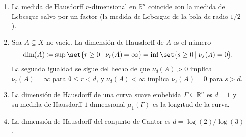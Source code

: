 \begin{nejer}
\begin{enumerate}[label = (\roman*), leftmargin=1.5em]
    \item La medida de Hausdorff $n$-dimensional en $\mathbb{R}^n$ coincide con la medida de Lebesgue salvo por un factor (la medida de Lebesgue de la bola de radio $1/2$).
    
    \item Sea $A \subseteq X$ no vacío. La dimensión de Hausdorff de $A$ es el número
    $$
    \dim(A) \coloneq \sup \set{r \ge 0 \mid \nu_r(A) = \infty} = \inf \set{s \ge 0 \mid \nu_s(A) = 0}.
    $$
    La segunda igualdad se sigue del hecho de que $\nu_d(A) > 0$ implica $\nu_r(A) = \infty$ para $0 \le r < d$, y $\nu_d(A) < \infty$ implica $\nu_s(A) = 0$ para $s > d$.
    
    \item La dimensión de Hausdorff de una curva suave embebida $\Gamma \subseteq \mathbb{R}^n$ es $d = 1$ y su medida de Hausdorff $1$-dimensional $\mu_1(\Gamma)$ es la longitud de la curva.
    
    \item La dimensión de Hausdorff del conjunto de Cantor es $d = \log(2) / \log(3)$.
\end{enumerate}
\end{nejer}

